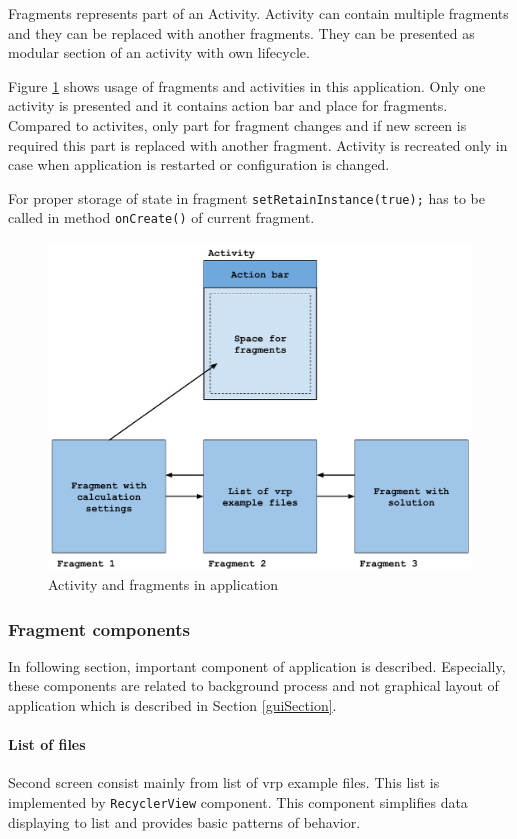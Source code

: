 Fragments represents part of an Activity. Activity can contain multiple fragments and they can be replaced with another
fragments. They can be presented as modular section of an activity with own lifecycle.

Figure \ref{activityFragment} shows usage of fragments and activities in this application. Only one activity is presented and it
contains action bar and place for fragments. Compared to activites, only part for fragment changes and if new screen is
required this part is replaced with another fragment. Activity is recreated only in case when application is restarted
or configuration is changed.

For proper storage of state in fragment \texttt{setRetainInstance(true);} has to be called in method \texttt{onCreate()}
of current fragment.

\begin{figure}[h!]
    \centering
    \includegraphics[scale=0.7]{fig/act_frag.pdf}
    \caption{Activity and fragments in application}
    \label{activityFragment}
\end{figure}

\subsubsection{Fragment components}
In following section, important component of application is described. Especially, these components are related to
background process and not graphical layout of application which is described in Section \ref{guiSection}.

\paragraph{List of files}
Second screen consist mainly from list of vrp example files. This list is implemented by \texttt{RecyclerView}
component. This component simplifies data displaying to list and provides basic patterns of behavior.

